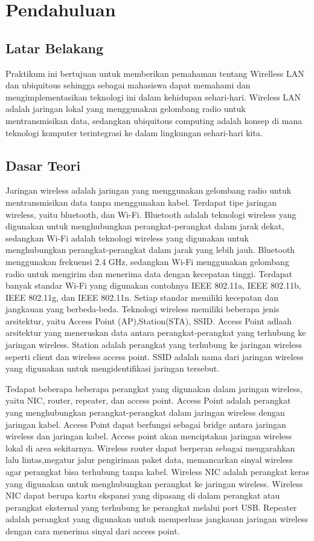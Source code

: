\section{Pendahuluan}
\subsection{Latar Belakang}
Praktikum ini bertujuan untuk memberikan pemahaman tentang Wirelless LAN dan ubiquitous sehingga sebagai
mahasiswa dapat memahami dan mengimplementasikan teknologi ini dalam kehidupan sehari-hari. Wireless LAN adalah jaringan lokal yang menggunakan gelombang radio untuk mentransmisikan data,
sedangkan ubiquitous computing adalah konsep di mana teknologi komputer terintegrasi ke dalam lingkungan sehari-hari kita.

\subsection{Dasar Teori}
Jaringan wireless adalah jaringan yang menggunakan gelombang radio untuk mentransmisikan data tanpa menggunakan kabel.
Terdapat tipe jaringan wireless, yaitu bluetooth, dan Wi-Fi. Bluetooth adalah teknologi wireless yang digunakan untuk 
menghubungkan perangkat-perangkat dalam jarak dekat, sedangkan Wi-Fi adalah teknologi wireless yang digunakan untuk 
menghubungkan perangkat-perangkat dalam jarak yang lebih jauh. Bluetooth menggunakan frekuensi 2.4 GHz, sedangkan Wi-Fi
menggunakan gelombang radio untuk mengirim dan menerima data dengan kecepatan tinggi. Terdapat banyak standar Wi-Fi yang digunakan
contohnya IEEE 802.11a, IEEE 802.11b, IEEE 802.11g, dan IEEE 802.11n. Setiap standar memiliki kecepatan dan jangkauan yang berbeda-beda.
Teknologi wireless memiliki beberapa jenis arsitektur, yaitu Access Point (AP),Station(STA), SSID. Access Point adlaah 
arsitektur yang meneruskan data antara perangkat-perangkat yang terhubung ke jaringan wireless. 
Station adalah perangkat yang terhubung ke jaringan wireless seperti client dan wireless access point.
SSID adalah nama dari jaringan wireless yang digunakan untuk mengidentifikasi jaringan tersebut.
	
Tedapat beberapa beberapa perangkat yang digunakan dalam jaringan wireless, yaitu NIC, router, repeater, dan access point. 
Access Point adalah perangkat yang menghubungkan perangkat-perangkat dalam jaringan wireless dengan jaringan kabel.
Access Point dapat berfungsi sebagai bridge antara jaringan wireless dan jaringan kabel. Access point akan menciptakan
jaringan wireless lokal di area sekitarnya. Wireless router dapat berperan sebagai mengarahkan lalu lintas,megatur jalur 
pengiriman paket data, memancarkan sinyal wireless agar perangkat bisa terhubung tanpa kabel.
Wireless NIC adalah perangkat keras yang digunakan untuk menghubungkan perangkat ke jaringan wireless. Wireless NIC dapat berupa
kartu ekspansi yang dipasang di dalam perangkat atau perangkat eksternal yang terhubung ke perangkat melalui port USB.
Repeater adalah perangkat yang digunakan untuk memperluas jangkauan jaringan wireless dengan cara menerima sinyal dari access point.
 
